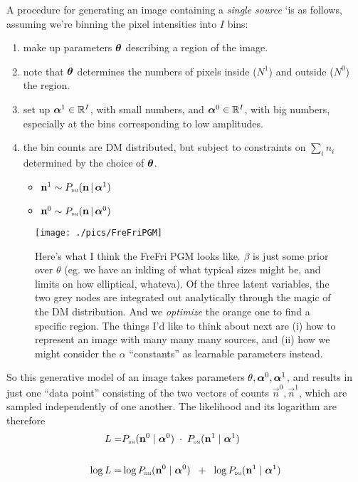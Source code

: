 \documentclass[12pt]{article}
\begin{document}
A procedure for generating an image containing a \emph{single source}
`is as follows, assuming we're binning the pixel intensities into $I$ bins:
\begin{enumerate}
\item make up parameters $\boldsymbol\theta$ describing a region of the image.
\item note that $\boldsymbol\theta$ determines the numbers of pixels inside ($N^1$)  and  outside ($N^0$) the region.
\item set up $\boldsymbol\alpha^1 \in \mathbb{R}^I$, with small numbers,
  and $\boldsymbol\alpha^0 \in \mathbb{R}^I$, with big numbers, especially at the bins corresponding to low amplitudes.
\item the bin counts are DM distributed, but subject to constraints on $\sum_i n_i$ determined by the choice of $\boldsymbol\theta$.
  \begin{itemize}
    \item    $\mathbf{n}^1 \sim P_\text{\tiny\sc dm}(\mathbf{n} \,|\, \boldsymbol\alpha^1)$
    \item $\mathbf{n}^0 \sim P_\text{\tiny\sc dm}(\mathbf{n} \,|\, \boldsymbol\alpha^0)$
  \end{itemize}
\end{enumerate}


\begin{figure}
\texttt{[image: ./pics/FreFriPGM]}
\caption{Here's what I think the {\sc FreFri} PGM looks like. $\beta$ is just some prior over $\theta$ (eg. we have an inkling of what typical sizes might be, and limits on how elliptical, whateva). Of the three latent variables, the two grey nodes are integrated out analytically through the magic of the DM distribution. And we {\it optimize} the orange one to find a specific region. The things I'd like to think about next are (i) how to represent an image with many many many sources, and (ii) how we might consider the $\alpha$ ``constants'' as learnable parameters instead.
\label{fig:FreFriPGM}
}
\end{figure}

So this generative model of an image takes parameters $\theta,
\boldsymbol\alpha^0, \boldsymbol\alpha^1$, and results in just one ``data point''
consisting of the two vectors of counts $\vec{n}^0,\vec{n}^1$, which are sampled independently of one another.  The
likelihood and its logarithm are therefore
\begin{align*}
L =& P_\text{\tiny\sc dm}(\mathbf{n}^0 \mid \boldsymbol\alpha^0) \; \cdot \; P_\text{\tiny\sc dm}(\mathbf{n}^1 \mid \boldsymbol\alpha^1) 
\\ \\
\log L =& \log P_\text{\tiny\sc dm}(\mathbf{n}^0 \mid \boldsymbol\alpha^0) \;\; + \;\; \log P_\text{\tiny\sc dm}(\mathbf{n}^1 \mid \boldsymbol\alpha^1) 
\end{align*}
\end{document}
